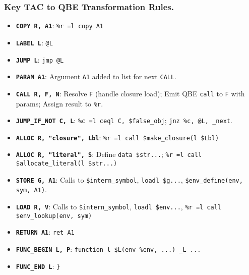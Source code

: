 \documentclass[final]{cmpreport_02}
\begin{document}
\subsubsection*{Key TAC to QBE Transformation Rules.}
\label{tab:qbe-transformations-appendix}
\begin{itemize}
    \item \textbf{\texttt{COPY R, A1}}: \texttt{\%r =l copy A1}
    \item \textbf{\texttt{LABEL L}}: \texttt{@L}
    \item \textbf{\texttt{JUMP L}}: \texttt{jmp @L}
    \item \textbf{\texttt{PARAM A1}}: Argument \texttt{A1} added to list for next \texttt{CALL}.
    \item \textbf{\texttt{CALL R, F, N}}: Resolve \texttt{F} (handle closure load); Emit QBE \texttt{call} to \texttt{F} with params; Assign result to \texttt{\%r}.
    \item \textbf{\texttt{JUMP\_IF\_NOT C, L}}: \texttt{\%c =l ceql C, \$false\_obj}; \texttt{jnz \%c, @L, \@L\_next}.
    \item \textbf{\texttt{ALLOC R, "closure", Lbl}}: \texttt{\%r =l call \$make\_closure(l \$Lbl)}
    \item \textbf{\texttt{ALLOC R, "literal", S}}: Define \texttt{data \$str...}; \texttt{\%r =l call \linebreak\$allocate\_literal(l \$str...)}
    \item \textbf{\texttt{STORE G, A1}}: Calls to \texttt{\$intern\_symbol}, \texttt{loadl \$g...}, \texttt{\$env\_define(env, sym, A1)}.
    \item \textbf{\texttt{LOAD R, V}}: Calls to \texttt{\$intern\_symbol}, \texttt{loadl \$env...}, \texttt{\%r =l call \$env\_lookup(env, sym)}
    \item \textbf{\texttt{RETURN A1}}: \texttt{ret A1}
    \item \textbf{\texttt{FUNC\_BEGIN L, P}}: \texttt{function l \$L(env \%env, ...){ \@start\_L ...}}
    \item \textbf{\texttt{FUNC\_END L}}: \texttt{\}}
\end{itemize}
\end{document}
